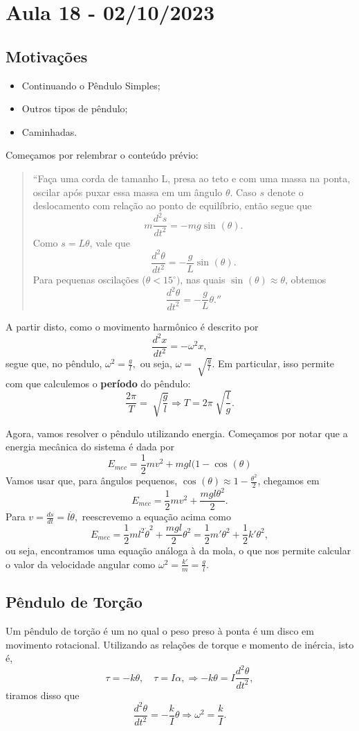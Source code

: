 \documentclass[physicsII_notes.tex]{subfiles}
\begin{document}
\section{Aula 18 - 02/10/2023}
\subsection{Motivações}
\begin{itemize}
	\item Continuando o Pêndulo Simples;
	\item Outros tipos de pêndulo;
	\item Caminhadas.
\end{itemize}
Começamos por relembrar o conteúdo prévio:
\begin{quote}``Faça uma corda de tamanho L, presa ao teto e com uma massa na ponta, oscilar após puxar essa massa em um ângulo \(\theta \).
	Caso \(s\) denote o deslocamento com relação ao ponto de equilíbrio, então segue que
	\[
		m \frac{d^{2}s}{dt^{2}} = -mg\sin^{}{(\theta )}.
	\]
	Como \(s = L\theta \), vale que
	\[
		\frac{d^{2}\theta }{dt^{2}}=-\frac{g}{L}\sin^{}{(\theta )}.
	\]
	Para pequenas oscilações (\(\theta < 15^{\circ})\), nas quais \(\sin^{}{(\theta )}\approx \theta \), obtemos
	\[
		\frac{d^{2}\theta }{dt^{2}} = -\frac{g}{L}\theta .''
	\]
\end{quote}
A partir disto, como o movimento harmônico é descrito por
\[
	\frac{d^{2}x}{dt^{2}}=-\omega^{2}x,
\]
segue que, no pêndulo, \(\omega^{2}=\frac{g}{l},\) ou seja, \(\omega = \sqrt[]{\frac{g}{l}}.\)
Em particular, isso permite com que calculemos o \textbf{período} do pêndulo:
\[
	\frac{2\pi }{T} = \sqrt[]{\frac{g}{l}} \Rightarrow T = 2\pi \sqrt[]{\frac{l}{g}}.
\]

Agora, vamos resolver o pêndulo utilizando energia. Começamos por notar que a energia mecânica do sistema é dada por
\[
	E_{mec} = \frac{1}{2}mv^{2} + mgl(1-\cos^{}{(\theta )}
\]
Vamos usar que, para ângulos pequenos, \(\cos^{}{(\theta )}\approx 1-\frac{\theta ^{2}}{2} \), chegamos em
\[
	E_{mec} = \frac{1}{2}mv^{2}+\frac{mgl\theta ^{2}}{2}.
\]
Para \(v=\frac{ds}{dt} = l\dot \theta ,\) reescrevemo a equação acima como
\[
	E_{mec} = \frac{1}{2}ml^{2}\dot\theta ^{2} + \frac{mgl}{2}\theta^{2} = \frac{1}{2}m'\theta ^{2} + \frac{1}{2}k'\theta ^{2},
\]
ou seja, encontramos uma equação análoga à da mola, o que nos permite calcular o valor da velocidade angular como \(\omega^{2}=\frac{k'}{m} = \frac{g}{l}.\)
\subsection{Pêndulo de Torção}
Um pêndulo de torção é um no qual o peso preso à ponta é um disco em movimento rotacional. Utilizando as relações de torque e momento de inércia, isto é,
\[
	\tau = -k\theta, \quad \tau = I\alpha, \Rightarrow -k\theta = I \frac{d^{2}\theta }{dt^{2}},
\]
tiramos disso que
\[
	\frac{d^{2}\theta }{dt^{2}} = - \frac{k}{I}\theta \Rightarrow \omega^{2} = \frac{k}{I}.
\]
\end{document}
